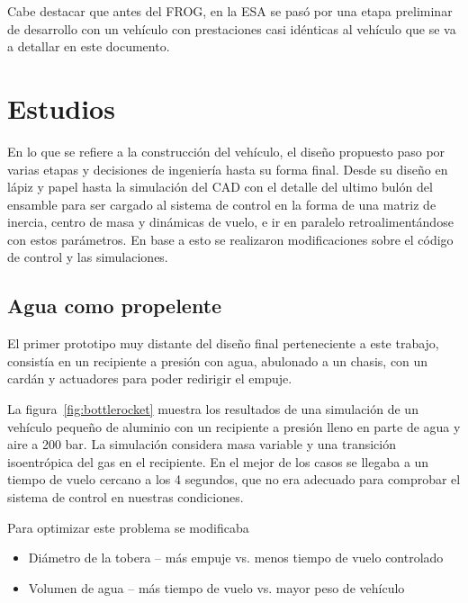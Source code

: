 Cabe destacar que antes del FROG, en la ESA se pasó por una etapa preliminar de desarrollo con un vehículo con prestaciones casi idénticas al vehículo que se va a detallar en este documento.



\section{Estudios}
En lo que se refiere a la construcción del vehículo, el diseño propuesto paso por varias etapas y
decisiones de ingeniería hasta su forma final. Desde su diseño en lápiz y papel hasta la
simulación del CAD con el detalle del ultimo bulón del ensamble para ser cargado al sistema de control en la forma de una matriz de inercia, centro de masa y dinámicas de vuelo, e ir en paralelo retroalimentándose con estos parámetros. En base a esto se realizaron modificaciones sobre el código de control y las simulaciones.


\subsection{Agua como propelente}\label{ssec:propAgua}
El primer prototipo muy distante del diseño final perteneciente a este trabajo, consistía en un
recipiente a presión con agua, abulonado a un chasis, con un cardán y actuadores para poder redirigir el
empuje. 

\medskip

La figura~\ref{fig:bottlerocket} muestra los resultados de una simulación de un vehículo pequeño de aluminio con un recipiente a presión lleno en parte de agua y aire a 200 bar. La simulación considera masa variable y una transición isoentrópica del gas en el recipiente. En el mejor de los casos se llegaba a un tiempo de vuelo cercano a los 4 segundos, que no era adecuado para comprobar el sistema de control en nuestras condiciones. 

Para optimizar este problema se modificaba

\begin{itemize}
    \item Diámetro de la tobera -- más empuje vs. menos tiempo de vuelo controlado
    \item Volumen de agua -- más tiempo de vuelo vs. mayor peso de vehículo
\end{itemize}


